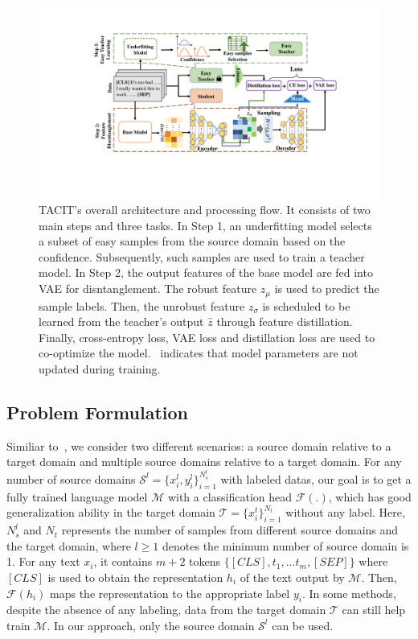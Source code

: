 \documentclass[letterpaper]{article} %
\begin{document}
\begin{figure}[t]
	\centering
	\includegraphics[width=1.5\columnwidth]{model.pdf} 
	\caption{TACIT's overall architecture and processing flow. It consists of two main steps and three tasks. In Step 1, an underfitting model selects a subset of easy samples from the source domain based on the confidence. Subsequently, such samples are used to train a teacher model. In Step 2, the output features of the base model are fed into VAE for disntanglement. The robust feature $z_\mu$ is used to predict the sample labels. Then, the unrobust feature $z_\sigma$ is scheduled to be learned from the teacher's output $\hat{z}$ through feature distillation. Finally, cross-entropy loss, VAE loss and distillation loss are used to co-optimize the model. \faLock ~indicates that model parameters are not updated during training.}
	\label{fig:model}
\end{figure}

\subsection{Problem Formulation}
Similiar to~\cite{WuS22}, we consider two different scenarios: a source domain relative to a target domain and multiple source domains relative to a target domain. For any number of source domains $\mathcal{S}^l=\{x_i^l, y_i^l\}_{i=1}^{N^l_s}$ with labeled datas, our goal is to get a fully trained language model $\mathcal{M}$ with a classification head $\mathcal{F}(.)$, which has good generalization ability in the target domain $\mathcal{T}=\{x_i^t\}_{i=1}^{N_t}$ without any label. Here, $N^l_s$ and $N_t$ represents the number of samples from different source domains and the target domain, where $l\geq 1$ denotes the minimum number of source domain is 1. For any text $x_i$, it contains $m+2$ tokens $\{[CLS], t_1, ... t_m, [SEP]\}$ where $[CLS]$ is used to obtain the representation $h_i$ of the text output by $\mathcal{M}$. Then, $\mathcal{F}(h_i)$ maps the representation to the appropriate label $y_i$. In some methods, despite the absence of any labeling, data from the target domain $\mathcal{T}$ can still help train $\mathcal{M}$. In our approach, only the source domain $\mathcal{S}^l$ can be used.
\end{document}
